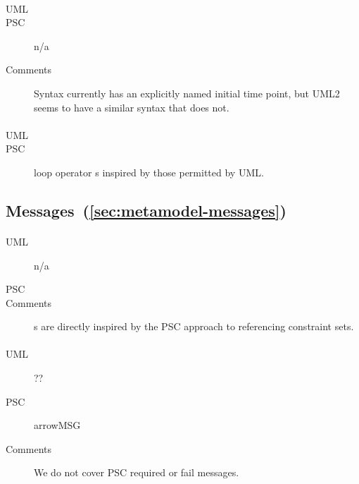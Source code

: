 \paragraph{\mdeadlinestep}
\begin{description}
\item[UML] 
\item[PSC] n/a
\item[Comments]
  Syntax currently has an explicitly named initial time point, but UML2
  seems to have a similar syntax that does not.  
\end{description}
      
\paragraph{\mloopstep}
\begin{description}
\item[UML] 
\item[PSC] loop operator
    \mloopbound s inspired by those permitted by UML.
\end{description}
      
\subsection{Messages~(\ref{sec:metamodel-messages})}

\paragraph{\mmessageset}
\begin{description}
\item[UML] n/a
\item[PSC] 
\item[Comments]
  \mrefmessageset s are directly inspired by the PSC approach to referencing constraint sets.
\end{description}

\paragraph{\marrowmessagespec}
\begin{description}
\item[UML] ??
\item[PSC] arrowMSG
\item[Comments]
  We do not cover PSC required or fail messages.
\end{description}

